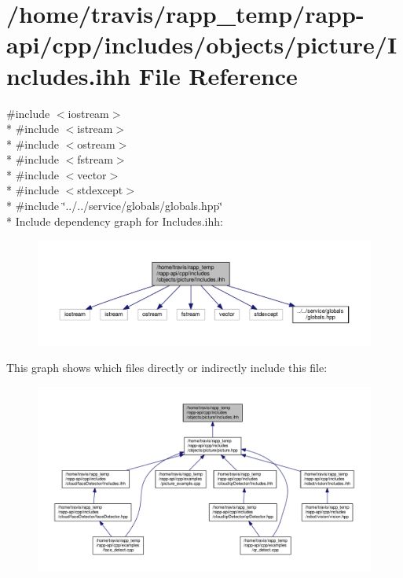 \hypertarget{objects_2picture_2Includes_8ihh}{\section{/home/travis/rapp\-\_\-temp/rapp-\/api/cpp/includes/objects/picture/\-Includes.ihh File Reference}
\label{objects_2picture_2Includes_8ihh}
}
{\ttfamily \#include $<$iostream$>$}\\*
{\ttfamily \#include $<$istream$>$}\\*
{\ttfamily \#include $<$ostream$>$}\\*
{\ttfamily \#include $<$fstream$>$}\\*
{\ttfamily \#include $<$vector$>$}\\*
{\ttfamily \#include $<$stdexcept$>$}\\*
{\ttfamily \#include \char`\"{}../../service/globals/globals.\-hpp\char`\"{}}\\*
Include dependency graph for Includes.\-ihh\-:
\nopagebreak
\begin{figure}[H]
\begin{center}
\leavevmode
\includegraphics[width=350pt]{objects_2picture_2Includes_8ihh__incl}
\end{center}
\end{figure}
This graph shows which files directly or indirectly include this file\-:
\nopagebreak
\begin{figure}[H]
\begin{center}
\leavevmode
\includegraphics[width=350pt]{objects_2picture_2Includes_8ihh__dep__incl}
\end{center}
\end{figure}
